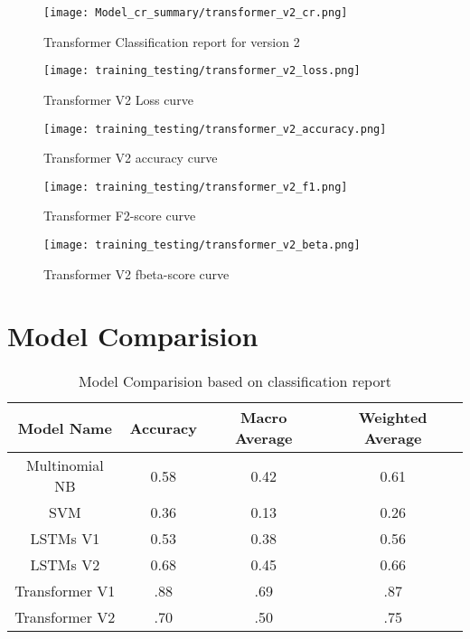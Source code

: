 \begin{figure}[H]
    \centering
    \texttt{[image: Model\_cr\_summary/transformer\_v2\_cr.png]}
    \caption{Transformer Classification report for version 2}
    \label{fig:Transformer Classification report for version 2}
\end{figure}

\begin{figure}[H]
    \centering
    \texttt{[image: training\_testing/transformer\_v2\_loss.png]}
    \caption{Transformer V2 Loss curve}
    \label{fig:Transformer V2 loss curve}
\end{figure}

\begin{figure}[H]
    \centering
    \texttt{[image: training\_testing/transformer\_v2\_accuracy.png]}
    \caption{Transformer V2 accuracy curve}
    \label{fig:Transformer V2 accuracy curve}
\end{figure}

\begin{figure}[H]
    \centering
    \texttt{[image: training\_testing/transformer\_v2\_f1.png]}
    \caption{Transformer F2-score curve}
    \label{fig:Transformer F2-score curve}
\end{figure}

\begin{figure}[H]
    \centering
    \texttt{[image: training\_testing/transformer\_v2\_beta.png]}
    \caption{Transformer V2 fbeta-score curve}
    \label{fig:Transformer V2 fbeta-score curve}
\end{figure}

\section{Model Comparision}
\begin{table}[H]
    \begin{center}
        \begin{tabular}{ |c|c|c|c| }
            \hline
            Model Name               & Accuracy & Macro Average & Weighted Average \\
            \hline
            Multinomial NB & 0.58 & 0.42 & 0.61\\
            \hline
            SVM            & 0.36       & 0.13 & 0.26\\
            \hline
            LSTMs V1    & 0.53      & 0.38 & 0.56\\
            \hline
            LSTMs V2    & 0.68  & 0.45 & 0.66\\
            \hline
            Transformer V1     & .88  & .69 & .87 \\
            \hline
            Transformer V2   &   .70   & .50 & .75 \\
            \hline
        \end{tabular}
    \end{center}
    \caption{Model Comparision based on classification report}
    \label{table:Model Comparision based on classification report}
\end{table}

